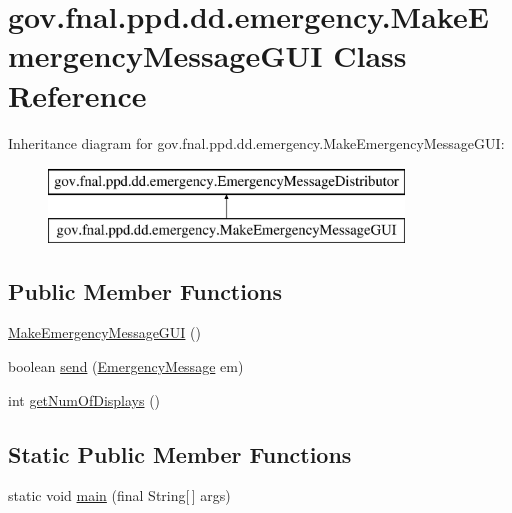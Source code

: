 \hypertarget{classgov_1_1fnal_1_1ppd_1_1dd_1_1emergency_1_1MakeEmergencyMessageGUI}{\section{gov.\-fnal.\-ppd.\-dd.\-emergency.\-Make\-Emergency\-Message\-G\-U\-I Class Reference}
\label{classgov_1_1fnal_1_1ppd_1_1dd_1_1emergency_1_1MakeEmergencyMessageGUI}
}
Inheritance diagram for gov.\-fnal.\-ppd.\-dd.\-emergency.\-Make\-Emergency\-Message\-G\-U\-I\-:\begin{figure}[H]
\begin{center}
\leavevmode
\includegraphics[height=2.000000cm]{classgov_1_1fnal_1_1ppd_1_1dd_1_1emergency_1_1MakeEmergencyMessageGUI}
\end{center}
\end{figure}
\subsection*{Public Member Functions}
\begin{DoxyCompactItemize}
\item 
\hyperlink{classgov_1_1fnal_1_1ppd_1_1dd_1_1emergency_1_1MakeEmergencyMessageGUI_adf2283d35ad21abb771f2a4c25f6a480}{Make\-Emergency\-Message\-G\-U\-I} ()
\item 
boolean \hyperlink{classgov_1_1fnal_1_1ppd_1_1dd_1_1emergency_1_1MakeEmergencyMessageGUI_afb44cf215f0085e5a43f07e493f02f21}{send} (\hyperlink{classgov_1_1fnal_1_1ppd_1_1dd_1_1emergency_1_1EmergencyMessage}{Emergency\-Message} em)
\item 
int \hyperlink{classgov_1_1fnal_1_1ppd_1_1dd_1_1emergency_1_1MakeEmergencyMessageGUI_abfa8df4faa5c546429424e38656d3d16}{get\-Num\-Of\-Displays} ()
\end{DoxyCompactItemize}
\subsection*{Static Public Member Functions}
\begin{DoxyCompactItemize}
\item 
static void \hyperlink{classgov_1_1fnal_1_1ppd_1_1dd_1_1emergency_1_1MakeEmergencyMessageGUI_a8be418fa3e7d67679f1f1d30a9bf48e1}{main} (final String\mbox{[}$\,$\mbox{]} args)
\end{DoxyCompactItemize}



